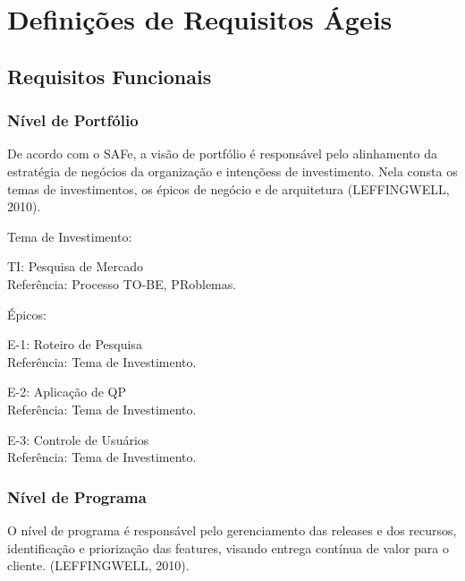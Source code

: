 \section{Definições de Requisitos Ágeis}
	
	\subsection{Requisitos Funcionais}

		\subsubsection{Nível de Portfólio}

			De acordo com o SAFe, a visão de portfólio é responsável pelo alinhamento da estratégia de negócios da organização e intençõess de investimento. Nela consta os temas de investimentos, os épicos de negócio e de arquitetura (LEFFINGWELL, 2010). 

			\begin{itemize}
			{
				\item Tema de Investimento:
				\begin{itemize}
				{
					\item TI: Pesquisa de Mercado\\
					Referência: Processo TO-BE, PRoblemas.
				}
				\end{itemize}

				\item Épicos:
				\begin{itemize}
				{
					\item E-1: Roteiro de Pesquisa\\
					Referência: Tema de Investimento.

					\item E-2: Aplicação de QP\\
					Referência: Tema de Investimento.

					\item E-3: Controle de Usuários\\
					Referência: Tema de Investimento.
				}
				\end{itemize}
			}
			\end{itemize}


		\subsubsection{Nível de Programa}

			O nível de programa é responsável pelo gerenciamento das releases e dos recursos, identificação e priorização das features, visando entrega contínua de valor para o cliente. (LEFFINGWELL, 2010).


